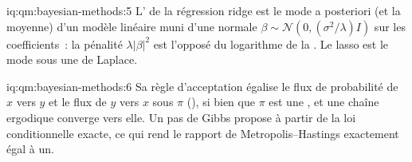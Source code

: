 \begin{solution}{iq:qm:bayesian-methods:5}
L' de la régression ridge est le mode a posteriori (et la moyenne) d'un modèle linéaire muni d'une  normale $\beta \sim \mathcal N(0, (\sigma^2/\lambda)I)$ sur
les coefficients~: la pénalité $\lambda\lvert\beta\rvert^2$ est l'opposé du logarithme de la . Le lasso est le mode sous une  de Laplace.
\end{solution}

\begin{solution}{iq:qm:bayesian-methods:6}
Sa règle d'acceptation égalise le flux de probabilité de $x$ vers $y$ et le flux de $y$ vers $x$ sous $\pi$ (), si bien que $\pi$ est une
, et une chaîne ergodique converge vers elle. Un pas de Gibbs propose à partir de la loi conditionnelle exacte, ce qui rend le rapport de Metropolis--Hastings
exactement égal à un.
\end{solution}
